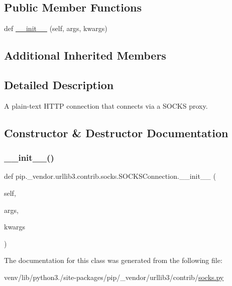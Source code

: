 \subsection*{Public Member Functions}
\begin{DoxyCompactItemize}
\item 
def \hyperlink{classpip_1_1__vendor_1_1urllib3_1_1contrib_1_1socks_1_1SOCKSConnection_ae2397ed688c54d21b1690388b3fb4c7d}{\+\_\+\+\_\+init\+\_\+\+\_\+} (self, args, kwargs)
\end{DoxyCompactItemize}
\subsection*{Additional Inherited Members}


\subsection{Detailed Description}
\begin{DoxyVerb}A plain-text HTTP connection that connects via a SOCKS proxy.
\end{DoxyVerb}
 

\subsection{Constructor \& Destructor Documentation}
\mbox{\label{classpip_1_1__vendor_1_1urllib3_1_1contrib_1_1socks_1_1SOCKSConnection_ae2397ed688c54d21b1690388b3fb4c7d}} 
\subsubsection{\texorpdfstring{\+\_\+\+\_\+init\+\_\+\+\_\+()}{\_\_init\_\_()}}
{\footnotesize\ttfamily def pip.\+\_\+vendor.\+urllib3.\+contrib.\+socks.\+S\+O\+C\+K\+S\+Connection.\+\_\+\+\_\+init\+\_\+\+\_\+ (\begin{DoxyParamCaption}\item[{}]{self,  }\item[{}]{args,  }\item[{}]{kwargs }\end{DoxyParamCaption})}



The documentation for this class was generated from the following file\+:\begin{DoxyCompactItemize}
\item 
venv/lib/python3./site-\/packages/pip/\+\_\+vendor/urllib3/contrib/\hyperlink{socks_8py}{socks.\+py}\end{DoxyCompactItemize}
